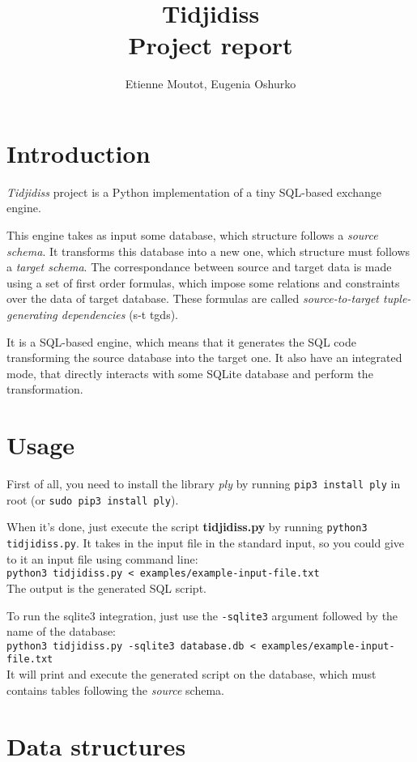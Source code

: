 \documentclass[a4paper,11pt]{article}
\title{{\Huge Tidjidiss}\\
Project report}
\author{Etienne Moutot, Eugenia Oshurko}
\begin{document}
\maketitle

\section{Introduction}
\textit{Tidjidiss} project is a Python implementation of a tiny SQL-based exchange engine.

This engine takes as input some database, which structure follows a \textit{source schema}. It transforms this database into a new one, which structure must follows a \textit{target schema}. The correspondance between source and target data is made using a set of first order formulas, which impose some relations and constraints over the data of target database. These formulas are called \textit{source-to-target tuple-generating dependencies} (s-t tgds).

It is a SQL-based engine, which means that it generates the SQL code transforming the source database into the target one. It also have an integrated mode, that directly interacts with some SQLite database and perform the transformation.

\section{Usage}
First of all, you need to install the library \textit{ply} by running \texttt{pip3 install ply} in root (or \texttt{sudo pip3 install ply}).

When it's done, just execute the script \textbf{tidjidiss.py} by running \texttt{python3 tidjidiss.py}. It takes in the input file in the standard input, so you could give to it an input file using command line:\\
\texttt{python3 tidjidiss.py < examples/example-input-file.txt}\\
The output is the generated SQL script.

To run the sqlite3 integration, just use the \texttt{-sqlite3} argument followed by the name of the database:\\
\texttt{python3 tidjidiss.py -sqlite3 database.db < examples/example-input-file.txt}\\
It will print and execute the generated script on the database, which must contains tables following the \textit{source} schema.

\section{Data structures}
\end{document}

